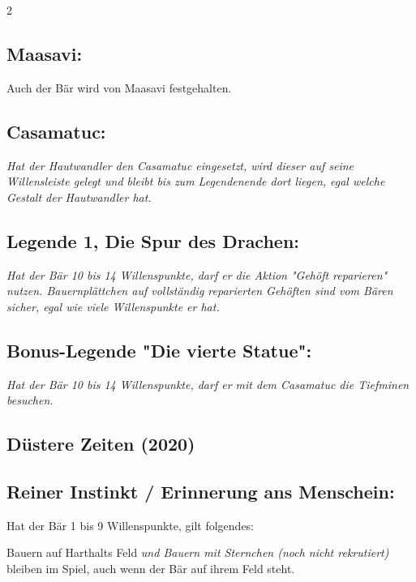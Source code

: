 \documentclass[10pt, a4paper, oneside]{book}
\newcommand{\fan}[1]{\textit{#1}}
\begin{document}
\begin{multicols*}{2}
\begin{bgcolor}[color-AG]
\subsection{Maasavi:}

Auch der Bär wird von Maasavi festgehalten.
\supercite{AG:Begleitheft}


\subsection{Casamatuc:}

\fan{Hat der Hautwandler den Casamatuc eingesetzt, wird dieser auf seine Willensleiste gelegt und bleibt bis zum Legendenende dort liegen, egal welche Gestalt der Hautwandler hat.}


\subsection{Legende 1, Die Spur des Drachen:}

\fan{Hat der Bär 10 bis 14 Willenspunkte, darf er die Aktion "Gehöft reparieren" nutzen. Bauernplättchen auf vollständig reparierten Gehöften sind vom Bären sicher, egal wie viele Willenspunkte er hat.}

\subsection{Bonus-Legende "Die vierte Statue":}

\fan{Hat der Bär 10 bis 14 Willenspunkte, darf er mit dem Casamatuc die Tiefminen besuchen.}

\end{bgcolor}





\columnbreak

\begin{bgcolor}[color-DZ]
\section{Düstere Zeiten (2020)}



\subsection{Reiner Instinkt / Erinnerung ans Menschein:}

Hat der Bär 1 bis 9 Willenspunkte, gilt folgendes:

\bullet{} Bauern auf Harthalts Feld \fan{und Bauern mit Sternchen (noch nicht rekrutiert)} bleiben im Spiel, auch wenn der Bär auf ihrem Feld steht.
\supercite{DZ:Begleitheft}


\end{bgcolor}
\end{multicols*}
\end{document}

